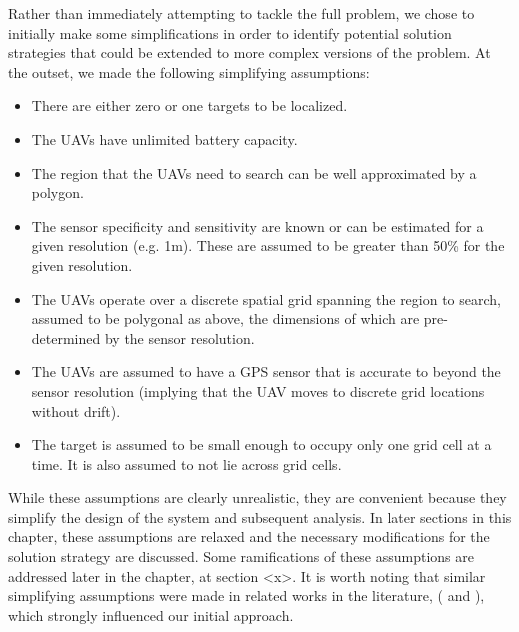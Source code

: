 Rather than immediately attempting to tackle the full problem, we chose to initially make some simplifications in order to identify potential solution strategies that could be extended to more complex versions of the problem. At the outset, we made the following simplifying assumptions:
\begin{itemize}
    \item There are either zero or one targets to be localized.
    \item The UAVs have unlimited battery capacity.
    \item The region that the UAVs need to search can be well approximated by a polygon.
    \item The sensor specificity and sensitivity are known or can be estimated for a given resolution (e.g. 1m). These are assumed to be greater than 50\% for the given resolution.
    \item The UAVs operate over a discrete spatial grid spanning the region to search, assumed to be polygonal as above, the dimensions of which are pre-determined by the sensor resolution.
    \item The UAVs are assumed to have a GPS sensor that is accurate to beyond the sensor resolution (implying that the UAV moves to discrete grid locations without drift).
    \item The target is assumed to be small enough to occupy only one grid cell at a time. It is also assumed to not lie across grid cells.
\end{itemize}
While these assumptions are clearly unrealistic, they are convenient because they simplify the design of the system and subsequent analysis. In later sections in this chapter, these assumptions are relaxed and the necessary modifications for the solution strategy are discussed. Some ramifications of these assumptions are addressed later in the chapter, at section <x>. It is worth noting that similar simplifying assumptions were made in related works in the literature, 
(\cite{Chung2007ASearch} and \cite{Waharte2010SupportingUAVs}), %
which strongly influenced our initial approach.

